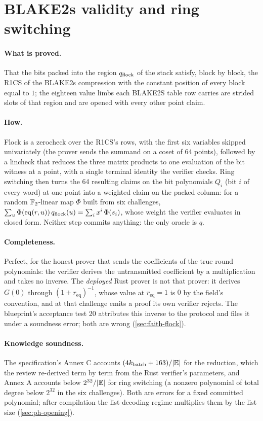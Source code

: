 \section{BLAKE2s validity and ring switching}\label{sec:ph-flock}

\paragraph{What is proved.} That the bits packed into the region $q_{\mathrm{flock}}$ of the stack satisfy,
block by block, the R1CS of the BLAKE2s compression with the constant position of every block
equal to $1$; the eighteen value limbs each BLAKE2S table row carries are strided slots of that
region and are opened with every other point claim.

\paragraph{How.} Flock is a zerocheck over the R1CS's rows, with the first six variables
skipped univariately (the prover sends the summand on a coset of 64 points), followed by a
lincheck that reduces the three matrix products to one evaluation of the bit witness at a
point, with a single terminal identity the verifier checks. Ring switching then turns the 64
resulting claims on the bit polynomials $Q_i$ (bit $i$ of every word) at one point into a
weighted claim on the packed column: for a random $\mathbb{F}_2$-linear map $\Phi$ built from six
challenges, $\sum_u \Phi(\mathrm{eq}(r, u))\, q_{\mathrm{flock}}(u) = \sum_i x^i\, \Phi(s_i)$, whose weight the
verifier evaluates in closed form. Neither step commits anything: the only oracle is $q$.

\paragraph{Completeness.} Perfect, for the honest prover that sends the coefficients of the
true round polynomials: the verifier derives the untransmitted coefficient by a multiplication
and takes no inverse. The \emph{deployed} Rust prover is not that prover: it derives $G(0)$
through $(1 + r_{\mathrm{eq}})^{-1}$, whose value at $r_{\mathrm{eq}} = 1$ is $0$ by the
field's convention, and at that challenge emits a proof its own verifier rejects. The
blueprint's acceptance test 20 attributes this inverse to the protocol and files it under a
soundness error; both are wrong (\cref{sec:faith-flock}).

\paragraph{Knowledge soundness.} The specification's Annex C accounts
$(4 k_{\mathrm{batch}} + 163) / \lvert \mathbb{E}\rvert$ for the reduction, which the review re-derived term by
term from the Rust verifier's parameters, and Annex A accounts below $2^{32} / \lvert \mathbb{E}\rvert$ for ring
switching (a nonzero polynomial of total degree below $2^{32}$ in the six challenges). Both are
errors for a fixed committed polynomial; after compilation the list-decoding regime multiplies
them by the list size (\cref{sec:ph-opening}).

